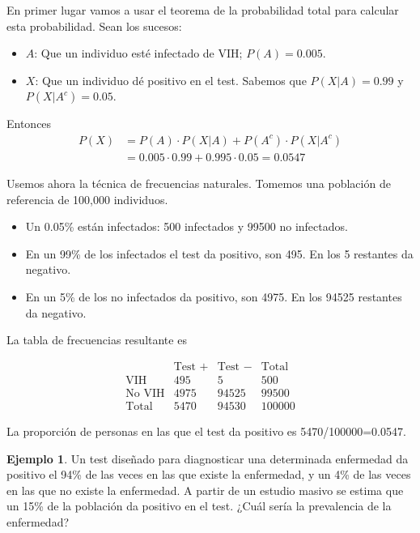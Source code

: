 \documentclass[
]{book}
\theoremstyle{definition}
\theoremstyle{definition}
\newtheorem{example}{Ejemplo}[chapter]
\theoremstyle{definition}
\theoremstyle{definition}
\theoremstyle{remark}
\begin{document}
En primer lugar vamos a usar el teorema de la probabilidad total para calcular esta probabilidad. Sean los sucesos:

\begin{itemize}
\item
  \(A\): Que un individuo esté infectado de VIH; \(P(A)=0.005\).
\item
  \(X\): Que un individuo dé positivo en el test. Sabemos que \(P(X|A)=0.99\) y \(P(X|A^c)= 0.05\).
\end{itemize}

Entonces
\[
\begin{array}{rl}
P(X) \!\!\!\!   &  =P(A)\cdot P(X|A)+P(A^c)\cdot P(X|A^c) \\
&=0.005\cdot 0.99+0.995\cdot 0.05=0.0547
\end{array}
\]

Usemos ahora la técnica de frecuencias naturales. Tomemos una población de referencia de 100,000 individuos.

\begin{itemize}
\item
  Un 0.05\% están infectados: 500 infectados y 99500 no infectados.
\item
  En un 99\% de los infectados el test da positivo, son 495. En los 5 restantes da negativo.
\item
  En un 5\% de los no infectados da positivo, son 4975. En los 94525 restantes da negativo.
\end{itemize}

La tabla de frecuencias resultante es

\[
\begin{array}{l|c|c|c}
& \text{Test }+ & \text{Test }- & \text{Total}\\
\hline
\text{VIH} & 495 & 5 & 500\\ \hline
\text{No VIH} & 4975& 94525 & 99500\\\hline
\text{Total} &5470 & 94530&  100000
\end{array}
\]

La proporción de personas en las que el test da positivo es 5470/100000=0.0547.

\begin{example}
\protect\hypertarget{exm:unnamed-chunk-138}{}\label{exm:unnamed-chunk-138}Un test diseñado para diagnosticar una determinada enfermedad da positivo el 94\% de las veces en las que existe la enfermedad, y un 4\% de las veces en las que no existe la enfermedad. A partir de un estudio masivo se estima que un 15\% de la población da positivo en el test. ¿Cuál sería la prevalencia de la enfermedad?
\end{example}
\end{document}

